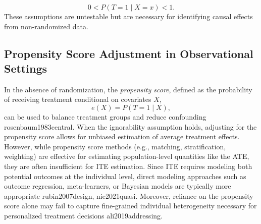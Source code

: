 \begin{equation}
0 < P(T = 1 \mid X = x) < 1.
\end{equation}
These assumptions are untestable but are necessary for identifying causal effects from non-randomized data.

\subsection{Propensity Score Adjustment in Observational Settings}

In the absence of randomization, the \textit{propensity score}, defined as the probability of receiving treatment conditional on covariates $X$,
\begin{equation}
e(X) = P(T = 1 \mid X),
\end{equation}
can be used to balance treatment groups and reduce confounding rosenbaum1983central. When the ignorability assumption holds, adjusting for the propensity score allows for unbiased estimation of average treatment effects. However, while propensity score methods (e.g., matching, stratification, weighting) are effective for estimating population-level quantities like the ATE, they are often insufficient for ITE estimation. Since ITE requires modeling both potential outcomes at the individual level, direct modeling approaches such as outcome regression, meta-learners, or Bayesian models are typically more appropriate rubin2007design, nie2021quasi. Moreover, reliance on the propensity score alone may fail to capture fine-grained individual heterogeneity necessary for personalized treatment decisions ali2019addressing.



